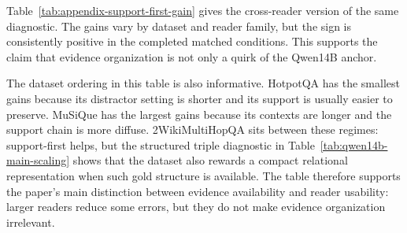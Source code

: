 \documentclass[a4paper,fleqn]{cas-sc}
\begin{document}
Table~\ref{tab:appendix-support-first-gain} gives the cross-reader version of
the same diagnostic. The gains vary by dataset and reader family, but the sign
is consistently positive in the completed matched conditions. This supports the
claim that evidence organization is not only a quirk of the Qwen14B anchor.

The dataset ordering in this table is also informative. HotpotQA has the
smallest gains because its distractor setting is shorter and its support is
usually easier to preserve. MuSiQue has the largest gains because its contexts
are longer and the support chain is more diffuse. 2WikiMultiHopQA sits between
these regimes: support-first helps, but the structured triple diagnostic in
Table~\ref{tab:qwen14b-main-scaling} shows that the dataset also rewards a
compact relational representation when such gold structure is available. The
table therefore supports the paper's main distinction between evidence
availability and reader usability: larger readers reduce some errors, but they
do not make evidence organization irrelevant.
\end{document}
